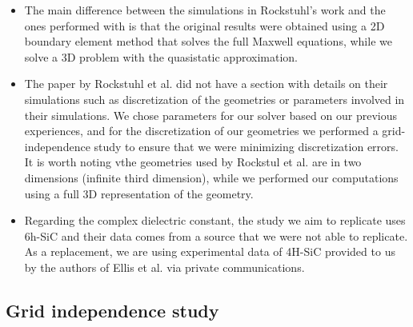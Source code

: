 \begin{itemize}

\item {The main difference between the simulations in Rockstuhl's work and the ones performed with \pygbe is that the original results were obtained 
using a 2D boundary element method that solves the full Maxwell equations, while we solve a 3D problem with the quasistatic approximation.}

\item{The paper by Rockstuhl et al. did not have a section with details on their simulations such as discretization of the geometries or parameters 
involved in their simulations. We chose parameters for our solver based on our previous experiences, and for the discretization of our 
geometries we performed a grid-independence study to ensure that we were minimizing discretization errors. It is worth noting vthe geometries used 
by Rockstul et al. are in two dimensions (infinite third dimension), while we performed our computations using a full 3D representation of the geometry.} 

\item {Regarding the complex dielectric constant, the study we aim to replicate uses 6h-SiC and their data comes from a source that we were not able
to replicate. As a replacement, we are using experimental data of 4H-SiC provided to us by the authors of Ellis et al. \cite{ellis2016} via 
private communications.}

\end{itemize}

\subsection{Grid independence study} \label{ssec:grid_indep_rock}

